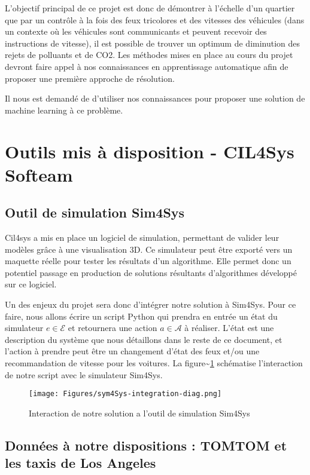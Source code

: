 \documentclass[11pt]{article}
\begin{document}
L'objectif principal de ce projet est donc de démontrer à l’échelle d’un quartier que par un contrôle à la fois des feux tricolores et des vitesses des véhicules (dans un contexte où les véhicules sont communicants et peuvent recevoir des instructions de vitesse), il est possible de trouver un optimum de diminution des rejets de polluants et de CO2. Les méthodes mises en place au cours du projet devront faire appel à nos connaissances en apprentissage automatique afin de proposer une première approche de résolution.

Il nous est demandé de d'utiliser nos connaissances pour proposer une solution de machine learning à ce problème. 

\section{Outils mis à disposition - CIL4Sys Softeam}
\label{sec:orgdec3f01}

\subsection{Outil de simulation Sim4Sys}
\label{sec:org16fbd78}

Cil4sys a mis en place un logiciel de simulation, permettant de valider leur modèles grâce à une visualisation 3D. Ce simulateur peut être exporté vers un maquette réelle pour tester les résultats d'un algorithme. Elle permet donc un potentiel passage en production de solutions résultants d'algorithmes développé sur ce logiciel.

Un des enjeux du projet sera donc d'intégrer notre solution à Sim4Sys. Pour ce faire, nous allons écrire un script Python qui prendra en entrée un état du simulateur \(e \in \mathcal{E}\) et retournera une action \(a \in \mathcal{A}\) à réaliser. L'état est une description du système que nous détaillons dans le reste de ce document, et l'action à prendre peut être un changement d'état des feux et/ou une recommandation de vitesse pour les voitures. La figure\textasciitilde{}\ref{fig:Sim4Sys-inte} schématise l'interaction de notre script avec le simulateur Sim4Sys.


\begin{figure}
\centering
\texttt{[image: Figures/sym4Sys-integration-diag.png]}
\caption[Sim4Sys-inte]{Interaction de notre solution a l'outil de simulation Sim4Sys}
\label{fig:Sim4Sys-inte}
\end{figure}

\subsection{Données à notre dispositions : TOMTOM et les taxis de Los Angeles}
\label{sec:org7a87309}
\end{document}
